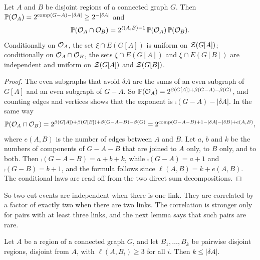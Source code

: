 \begin{lemma}\label{lem:link}
Let $A$ and $B$ be disjoint regions of a connected graph $G$. Then
$\mathbb{P}(\mathcal{O}_A)=2^{\operatorname{comp}(G-A)-|\delta A|}\ge2^{-|\delta A|}$ and
\[
  \mathbb{P}(\mathcal{O}_A\cap\mathcal{O}_B)=2^{\ell(A,B)-1}\,\mathbb{P}(\mathcal{O}_A)\,\mathbb{P}(\mathcal{O}_B).
\]
Conditionally on $\mathcal{O}_A$, the set $\xi\cap E(G[A])$ is uniform on $\mathcal{Z}(G[A])$; conditionally on
$\mathcal{O}_A\cap\mathcal{O}_B$, the sets $\xi\cap E(G[A])$ and $\xi\cap E(G[B])$ are independent and uniform on
$\mathcal{Z}(G[A])$ and $\mathcal{Z}(G[B])$.
\end{lemma}

\begin{proof}
The even subgraphs that avoid $\delta A$ are the sums of an even subgraph of $G[A]$ and an even
subgraph of $G-A$. So $\mathbb{P}(\mathcal{O}_A)=2^{\beta(G[A])+\beta(G-A)-\beta(G)}$, and counting edges and
vertices shows that the exponent is $\comp(G-A)-|\delta A|$. In the same way
\[
  \mathbb{P}(\mathcal{O}_A\cap\mathcal{O}_B)=2^{\beta(G[A])+\beta(G[B])+\beta(G-A-B)-\beta(G)}
     =2^{\operatorname{comp}(G-A-B)+1-|\delta A|-|\delta B|+e(A,B)},
\]
where $e(A,B)$ is the number of edges between $A$ and $B$. Let $a$, $b$ and $k$ be the numbers of
components of $G-A-B$ that are joined to $A$ only, to $B$ only, and to both. Then
$\comp(G-A-B)=a+b+k$, while $\comp(G-A)=a+1$ and $\comp(G-B)=b+1$, and the formula follows since
$\ell(A,B)=k+e(A,B)$. The conditional laws are read off from the two direct sum decompositions.
\end{proof}

So two cut events are independent when there is one link. They are correlated by a factor of
exactly two when there are two links. The correlation is stronger only for pairs with at least
three links, and the next lemma says that such pairs are rare.

\begin{lemma}\label{lem:exc}
Let $A$ be a region of a connected graph $G$, and let $B_1,\dots,B_k$ be pairwise disjoint regions,
disjoint from $A$, with $\ell(A,B_i)\ge3$ for all $i$. Then $k\le|\delta A|$.
\end{lemma}

